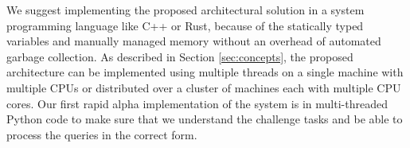 We suggest implementing the proposed architectural solution in a system programming language like C++ or Rust, because of the statically typed variables and manually managed memory without an overhead of automated garbage collection. As described in Section \ref{sec:concepts}, the proposed architecture can be implemented using multiple threads on a single machine with multiple CPUs or distributed over a cluster of machines each with multiple CPU cores.
Our first rapid alpha implementation of the system is in multi-threaded Python code to make sure that we understand the challenge tasks and be able to process the queries in the correct form.
